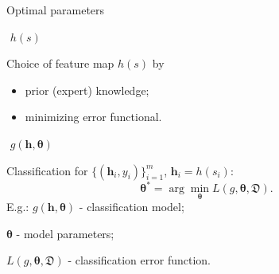 \documentclass{beamer}
\begin{document}
\begin{frame}{Optimal parameters}
	
	\begin{minipage}[t]{0.15\columnwidth}
		\vspace{-0.6cm}
		\begin{block}{}
			\centering
			\vspace{0.5cm}
			$\,\,h(s)$
			\vspace{0.5cm}
		\end{block}
	\end{minipage}	
	\hfill
	\begin{minipage}[t]{0.8\columnwidth}
			Choice of feature map $h(s)$ by 
			\begin{itemize}
				\item prior (expert) knowledge;
				\item minimizing error functional.
			\end{itemize}
	\end{minipage}
\vfill
	\begin{minipage}[t]{0.15\columnwidth}
		\vspace{-0.6cm}
		\begin{block}{}
			\centering
			\vspace{1.3cm}
			$\,\,g(\bm{h}, \bm\theta)$
			\vspace{1.3cm}
		\end{block}
	\end{minipage}	
	\hfill
	\begin{minipage}[t]{0.8\columnwidth}
			Classification for $\{(\bm{h}_i , y_i)\}_{i=1}^m$, $\bm{h}_i = h(s_i)$:
			\[
				\bm{\theta}^* = \arg \min_{\bm\theta} L(g, \bm\theta, \mathfrak{D}).
			\]
		E.g.: $g(\mathbf{h}, \bm\theta)$ - classification model;
		
		\hspace{0.9cm}$\bm\theta$ - model parameters;
				
		\hspace{0.9cm}$L (g, \bm\theta, \mathfrak{D})$ - classification error function.
	\end{minipage}	

	

\end{frame}
\end{document}
